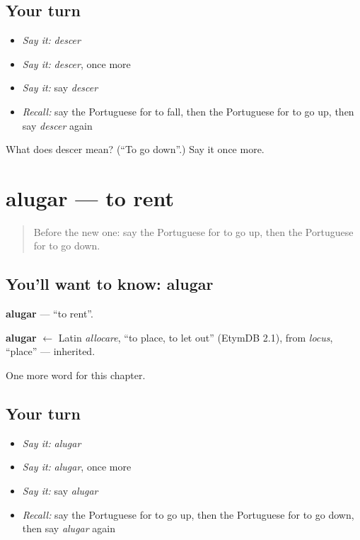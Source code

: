 \subsection*{Your turn}
\begin{itemize}
\raggedright
  \item \emph{Say it:} \emph{descer}
  \item \emph{Say it:} \emph{descer}, once more
  \item \emph{Say it:} say \emph{descer}
  \item \emph{Recall:} say the Portuguese for to fall, then the Portuguese for to go up, then say \emph{descer} again
\end{itemize}

\begin{tcolorbox}[breakable,colback=teal!4,colframe=teal!35!black,title={Before you move on}]
What does descer mean? (\textquotedblleft{}To go down\textquotedblright{}.) Say it once more.
\end{tcolorbox}
\section[alugar]{alugar — to rent}

\label{lesson:PT-C133-alugar}



\begin{quote}
Before the new one: say the Portuguese for to go up, then the Portuguese for to go down.
\end{quote}

\subsection*{You'll want to know: alugar}
\textbf{alugar} — \textquotedblleft{}to rent\textquotedblright{}.

\begin{cousinweb}
\textbf{alugar} $\leftarrow$ Latin \emph{allocare}, \textquotedblleft{}to place, to let out\textquotedblright{} (EtymDB 2.1), from \emph{locus}, \textquotedblleft{}place\textquotedblright{} — inherited.
\end{cousinweb}

\begin{grammarlens}[title={What you've built}]
One more word for this chapter.
\end{grammarlens}

\subsection*{Your turn}
\begin{itemize}
\raggedright
  \item \emph{Say it:} \emph{alugar}
  \item \emph{Say it:} \emph{alugar}, once more
  \item \emph{Say it:} say \emph{alugar}
  \item \emph{Recall:} say the Portuguese for to go up, then the Portuguese for to go down, then say \emph{alugar} again
\end{itemize}

